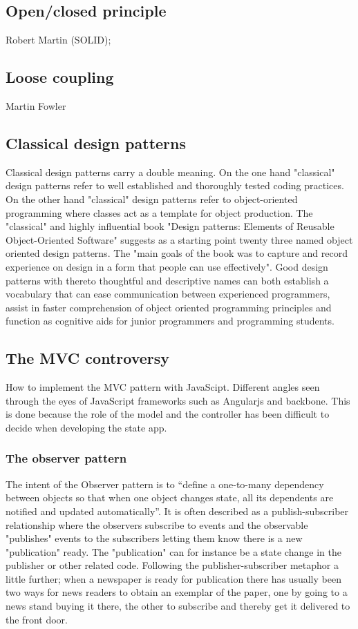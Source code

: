 \documentclass[english]{ifimaster}
\begin{document}
\subsection{Open/closed principle}
Robert Martin (SOLID);
\subsection {Loose coupling}
Martin Fowler

\subsection{Classical design patterns}
Classical design patterns carry a double meaning. On the one hand "classical" design patterns refer to well established and thoroughly tested coding practices\parencite[p. 12]{gamma}. On the other hand "classical" design patterns refer to object-oriented programming where classes act as a template for object production\parencite[p. 115]{stefanov}. The "classical" and highly influential book "Design patterns: Elements of Reusable Object-Oriented Software" suggests as a starting point twenty three named object oriented design patterns. The "main goals of the book was to capture and record experience on design in a form that people can use effectively"\parencite[p. 12]{gamma}. Good design patterns with thereto thoughtful and descriptive names can both establish a vocabulary that can ease communication between experienced programmers, assist in faster comprehension of object oriented programming principles and function as cognitive aids for junior programmers and programming students.


\subsection{The MVC controversy}
How to implement the MVC pattern with JavaScipt. Different angles seen through the eyes of JavaScript frameworks such as Angularjs and backbone. This is done because the role of the model and the controller has been difficult to decide when developing the state app.

\subsubsection{The observer pattern}
The intent of the Observer pattern is to “define a one-to-many dependency between objects so that when one object changes state, all its dependents are notified and updated automatically”\parencite[p. 9]{gamma}. It is often described as a publish-subscriber relationship where the observers subscribe to events and the observable "publishes" events to the subscribers letting them know there is a new "publication" ready. The "publication" can for instance be a state change in the publisher or other related code. Following the publisher-subscriber metaphor a little further; when a newspaper is ready for publication there has usually been two ways for news readers to obtain an exemplar of the paper, one by going to a news stand buying it there, the other to subscribe and thereby get it delivered to the front door\parencite[p. 171-174]{stefanov}.
\end{document}
